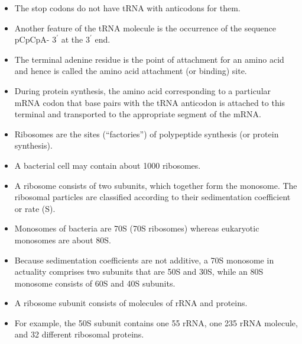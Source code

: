 \documentclass[11pt,ignorenonframetext,aspectratio=169]{beamer}
\providecommand{\tightlist}{%
  \setlength{\itemsep}{0pt}\setlength{\parskip}{0pt}}
\begin{document}
\begin{frame}{}
\protect\hypertarget{section-8}{}

\begin{itemize}
\tightlist
\item
  The stop codons do not have tRNA with anticodons for them.
\item
  Another feature of the tRNA molecule is the occurrence of the sequence
  pCpCpA- \(3^\prime\) at the \(3^\prime\) end.
\item
  The terminal adenine residue is the point of attachment for an amino
  acid and hence is called the amino acid attachment (or binding) site.
\item
  During protein synthesis, the amino acid corresponding to a particular
  mRNA codon that base pairs with the tRNA anticodon is attached to this
  terminal and transported to the appropriate segment of the mRNA.
\end{itemize}

\end{frame}

\begin{frame}{}
\protect\hypertarget{section-9}{}

\begin{itemize}
\tightlist
\item
  Ribosomes are the sites (``factories'') of polypeptide synthesis (or
  protein synthesis).
\item
  A bacterial cell may contain about 1000 ribosomes.
\item
  A ribosome consists of two subunits, which together form the monosome.
  The ribosomal particles are classified according to their
  sedimentation coefficient or rate (S).
\item
  Monosomes of bacteria are 70S (70S ribosomes) whereas eukaryotic
  monosomes are about 80S.
\item
  Because sedimentation coefficients are not additive, a 70S monosome in
  actuality comprises two subunits that are 50S and 30S, while an 80S
  monosome consists of 60S and 40S subunits.
\item
  A ribosome subunit consists of molecules of rRNA and proteins.
\item
  For example, the 50S subunit contains one 55 rRNA, one 235 rRNA
  molecule, and 32 different ribosomal proteins.
\end{itemize}

\end{frame}
\end{document}
